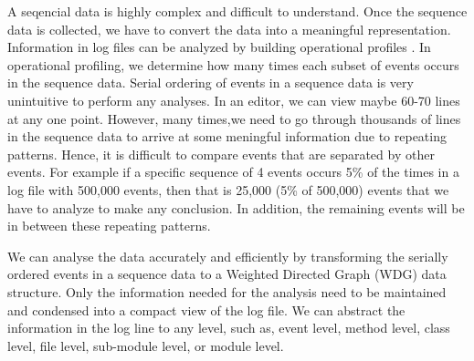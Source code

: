 A seqencial data is highly complex and difficult to understand. Once the sequence data is collected, we have to convert the data into a meaningful representation. Information in log files can be analyzed by building operational profiles \cite{hmf08}\cite{nwv09}. In operational profiling, we determine how many times each subset of events occurs in the sequence data. Serial ordering of events in a sequence data is very unintuitive to perform any analyses. In an editor, we can view maybe 60-70 lines at any one point. However, many times,we need to go through thousands of lines in the sequence data to arrive at some meningful information due to repeating patterns. Hence, it is difficult to compare events that are separated by other events. For example if a specific sequence of 4 events occurs 5\% of the times in a log file with 500,000 events, then that is 25,000 (5\% of 500,000) events that we have to analyze to make any conclusion. In addition, the remaining events will be in between these repeating patterns.

We can analyse the data accurately and efficiently by transforming the serially ordered events in a sequence data to a Weighted Directed Graph (WDG) data structure. Only the information needed for the analysis need to be maintained and condensed into a compact view of the log file. We can abstract the information in the log line to any level, such as, event level, method level, class level, file level, sub-module level, or module level.

